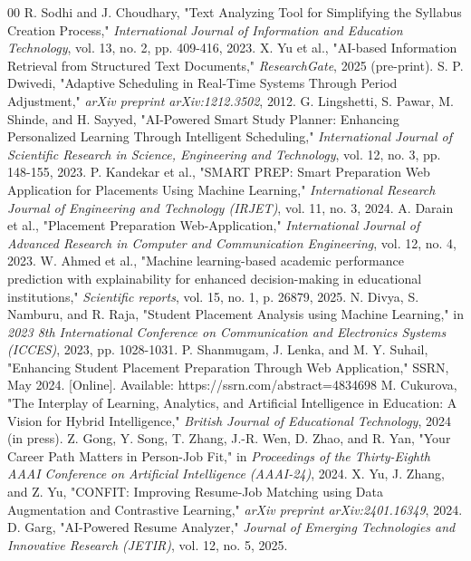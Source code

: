 \documentclass[12pt]{article}
\begin{document}
\begin{thebibliography}{00}
 R. Sodhi and J. Choudhary, "Text Analyzing Tool for Simplifying the Syllabus Creation Process," \textit{International Journal of Information and Education Technology}, vol. 13, no. 2, pp. 409-416, 2023.
 X. Yu et al., "AI-based Information Retrieval from Structured Text Documents," \textit{ResearchGate}, 2025 (pre-print).
 S. P. Dwivedi, "Adaptive Scheduling in Real-Time Systems Through Period Adjustment," \textit{arXiv preprint arXiv:1212.3502}, 2012.
 G. Lingshetti, S. Pawar, M. Shinde, and H. Sayyed, "AI-Powered Smart Study Planner: Enhancing Personalized Learning Through Intelligent Scheduling," \textit{International Journal of Scientific Research in Science, Engineering and Technology}, vol. 12, no. 3, pp. 148-155, 2023.
 P. Kandekar et al., "SMART PREP: Smart Preparation Web Application for Placements Using Machine Learning," \textit{International Research Journal of Engineering and Technology (IRJET)}, vol. 11, no. 3, 2024.
 A. Darain et al., "Placement Preparation Web-Application," \textit{International Journal of Advanced Research in Computer and Communication Engineering}, vol. 12, no. 4, 2023.
 W. Ahmed et al., "Machine learning-based academic performance prediction with explainability for enhanced decision-making in educational institutions," \textit{Scientific reports}, vol. 15, no. 1, p. 26879, 2025.
 N. Divya, S. Namburu, and R. Raja, "Student Placement Analysis using Machine Learning," in \textit{2023 8th International Conference on Communication and Electronics Systems (ICCES)}, 2023, pp. 1028-1031.
 P. Shanmugam, J. Lenka, and M. Y. Suhail, "Enhancing Student Placement Preparation Through Web Application," SSRN, May 2024. [Online]. Available: https://ssrn.com/abstract=4834698
 M. Cukurova, "The Interplay of Learning, Analytics, and Artificial Intelligence in Education: A Vision for Hybrid Intelligence," \textit{British Journal of Educational Technology}, 2024 (in press).
 Z. Gong, Y. Song, T. Zhang, J.-R. Wen, D. Zhao, and R. Yan, "Your Career Path Matters in Person-Job Fit," in \textit{Proceedings of the Thirty-Eighth AAAI Conference on Artificial Intelligence (AAAI-24)}, 2024.
 X. Yu, J. Zhang, and Z. Yu, "CONFIT: Improving Resume-Job Matching using Data Augmentation and Contrastive Learning," \textit{arXiv preprint arXiv:2401.16349}, 2024.
 D. Garg, "AI-Powered Resume Analyzer," \textit{Journal of Emerging Technologies and Innovative Research (JETIR)}, vol. 12, no. 5, 2025.
\end{thebibliography}
\end{document}
